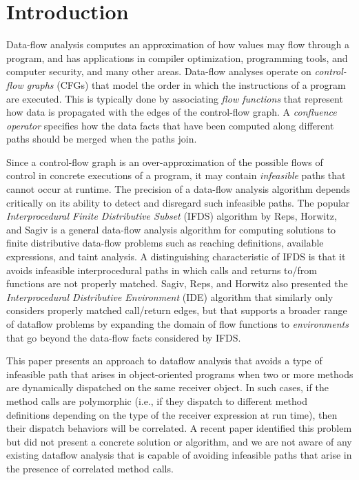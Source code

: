 \section{Introduction}

Data-flow analysis computes an approximation of how values may flow  
through a program, and has applications in compiler optimization, 
programming tools, and computer security, and many other areas.
Data-flow analyses operate on \textit{control-flow graphs} (CFGs) that model 
the order in which the instructions of a program are executed. This is
typically done by associating \textit{flow functions} that represent how 
data is propagated with the edges of the control-flow graph.  A 
\textit{confluence operator} specifies how the data facts that have been 
computed along different paths should be merged when the paths join.

Since a control-flow graph is an over-approximation of the possible flows 
of control in concrete executions of a program, it may contain \textit{infeasible} 
paths that cannot occur at runtime. The precision of a data-flow analysis algorithm
depends critically on its ability to detect and disregard such infeasible paths.
The popular \textit{Interprocedural Finite Distributive Subset} (IFDS) algorithm 
by  Reps, Horwitz, and Sagiv \cite{reps1995precise} is a general data-flow analysis
algorithm for computing solutions to finite distributive data-flow problems such 
as reaching definitions, available expressions, and taint analysis. A distinguishing 
characteristic of IFDS is that it avoids infeasible interprocedural paths in which calls 
and returns to/from functions are not properly matched. Sagiv, Reps, and Horwitz
also presented the \textit{Interprocedural Distributive Environment} (IDE) algorithm
\cite{sagiv1996precise} that similarly only considers properly matched call/return
edges, but that supports a broader range of dataflow problems by expanding the 
domain of flow functions to \textit{environments} that go beyond the data-flow facts 
considered by IFDS.

This paper presents an approach to dataflow analysis that avoids a type
of infeasible path that arises in object-oriented programs when two or more
methods are dynamically dispatched on the same receiver object. In such cases, if the
method calls are polymorphic (i.e., if they dispatch to different method definitions 
depending on the type of the receiver expression at run time), then their dispatch 
behaviors will be correlated. A recent paper \cite{DBLP:journals/scp/Tip15} identified
this problem but did not present a concrete solution or algorithm, and we are not aware 
of any existing dataflow analysis that is capable of avoiding infeasible paths that arise 
in the presence of correlated method calls.

